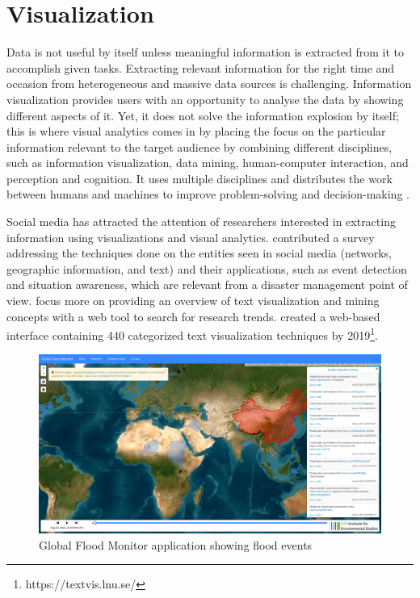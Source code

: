 \section{Visualization}
Data is not useful by itself unless meaningful information is extracted from it to accomplish
given tasks. Extracting relevant information for the right time and occasion from heterogeneous
and massive data sources is challenging. Information visualization provides users with an
opportunity to analyse the data by showing different aspects of it. Yet, it does not solve the
information explosion by itself; this is where visual analytics comes in by placing the focus on
the particular information relevant to the target audience by combining different disciplines, such as
information visualization, data mining, human-computer interaction, and perception and
cognition. It uses multiple disciplines and distributes the work between humans and machines to
improve problem-solving and decision-making \cite{keimVisualAnalyticsDefinition2008}.

Social media has attracted the attention of researchers interested in extracting information using
visualizations and visual analytics.  contributed a survey
addressing the techniques done on the entities seen in social media (networks, geographic information,
and text) and their applications, such as event detection and situation awareness, which are
relevant from a disaster management point of view. 
focus more on providing an overview of text visualization and mining concepts with a web tool to
search for research trends.  created a web-based
interface containing 440 categorized text visualization techniques by
2019\footnote{https://textvis.lnu.se/}.

\begin{figure}[ht!]
\begin{center}
  \includegraphics[width=\columnwidth]{images/global.png}
\end{center}
\caption{Global Flood Monitor application showing flood events}
\label{fig:global}
\end{figure}

